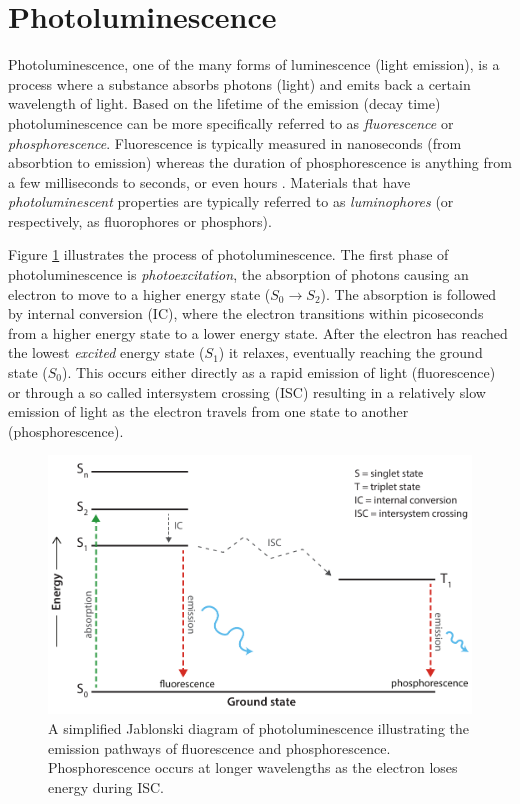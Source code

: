 \documentclass[thesis.tex]{subfiles}
\begin{document}
\section{Photoluminescence}
\label{section:photoluminescence}
\enlargethispage{2\baselineskip}
Photoluminescence, one of the many forms of luminescence (light emission), is a process where a substance absorbs photons (light) and emits back a certain wavelength of light. Based on the lifetime of the emission (decay time) photoluminescence can be more specifically referred to as \emph{fluorescence} or \emph{phosphorescence}. Fluorescence is typically measured in nanoseconds (from absorbtion to emission) whereas the duration of phosphorescence is anything from a few milliseconds to seconds, or even hours \cite{luminescence_basics}. Materials that have \emph{photoluminescent} properties are typically referred to as \emph{luminophores} (or respectively, as fluorophores or phosphors).

Figure \ref{figure:photoluminescence} illustrates the process of photoluminescence. The first phase of photoluminescence is \emph{photoexcitation}, the absorption of photons causing an electron to move to a higher energy state ($S_0 \rightarrow S_2$). The absorption is followed by internal conversion (IC), where the electron transitions within picoseconds from a higher energy state to a lower energy state. After the electron has reached the lowest \emph{excited} energy state ($S_1$) it relaxes, eventually reaching the ground state ($S_0$). This occurs either directly as a rapid emission of light (fluorescence) or through a so called intersystem crossing (ISC) resulting in a relatively slow emission of light as the electron travels from one state to another (phosphorescence).


\begin{figure}[h!]
\vspace{-4mm}
\centering \includegraphics[width=\textwidth]{images/photoluminescence.pdf}
\vspace{-8mm}
\caption{A simplified Jablonski diagram of photoluminescence illustrating the emission pathways of fluorescence and phosphorescence. Phosphorescence occurs at longer wavelengths as the electron loses energy during ISC. \label{figure:photoluminescence}}
\end{figure}
\end{document}
